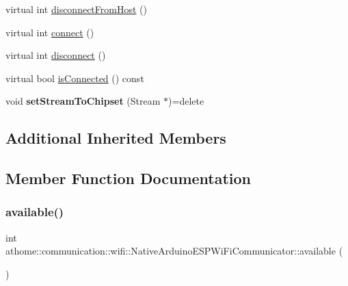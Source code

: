 \begin{DoxyCompactItemize}
\item 
virtual int \mbox{\hyperlink{classathome_1_1communication_1_1wifi_1_1_native_arduino_e_s_p_wi_fi_communicator_a8fa44a5078cb7d61f01b306e1d0d1bfe}{disconnect\+From\+Host}} ()
\item 
virtual int \mbox{\hyperlink{classathome_1_1communication_1_1wifi_1_1_native_arduino_e_s_p_wi_fi_communicator_abc07f2d953fa91f86b8919858e10bbd7}{connect}} ()
\item 
virtual int \mbox{\hyperlink{classathome_1_1communication_1_1wifi_1_1_native_arduino_e_s_p_wi_fi_communicator_a3787e850d48d149ee1392ebfb2920bb3}{disconnect}} ()
\item 
virtual bool \mbox{\hyperlink{classathome_1_1communication_1_1wifi_1_1_native_arduino_e_s_p_wi_fi_communicator_a1ad428f03137d93a142ec5ae72f19e14}{is\+Connected}} () const
\item 
\mbox{\label{classathome_1_1communication_1_1wifi_1_1_native_arduino_e_s_p_wi_fi_communicator_a2fbcf882d14174fdcd81aba6a2e7ad54}} 
void {\bfseries set\+Stream\+To\+Chipset} (Stream $\ast$)=delete
\end{DoxyCompactItemize}
\subsection*{Additional Inherited Members}


\subsection{Member Function Documentation}
\mbox{\label{classathome_1_1communication_1_1wifi_1_1_native_arduino_e_s_p_wi_fi_communicator_a6cd3fe64efeb1085c7e6dc71a740a24b}} 
\subsubsection{\texorpdfstring{available()}{available()}}
{\footnotesize\ttfamily int athome\+::communication\+::wifi\+::\+Native\+Arduino\+E\+S\+P\+Wi\+Fi\+Communicator\+::available (\begin{DoxyParamCaption}{ }\end{DoxyParamCaption})\hspace{0.3cm}{\ttfamily [virtual]}}

